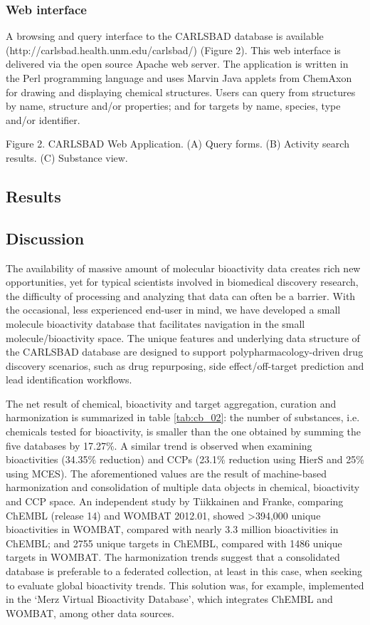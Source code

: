 \subsubsection{Web interface}

A browsing and query interface to the CARLSBAD database is available (http://carlsbad.health.unm.edu/carlsbad/) (Figure 2). This web interface is delivered via the open source Apache web server. The application is written in the Perl programming language and uses Marvin Java applets from ChemAxon for drawing and displaying chemical structures. Users can query from structures by name, structure and/or properties; and for targets by name, species, type and/or identifier.

Figure 2.
CARLSBAD Web Application. (A) Query forms. (B) Activity search results. (C) Substance view.

\subsection{Results}

\subsection{Discussion}

The availability of massive amount of molecular bioactivity data creates rich new opportunities, yet for typical scientists involved in biomedical discovery research, the difficulty of processing and analyzing that data can often be a barrier. With the occasional, less experienced end-user in mind, we have developed a small molecule bioactivity database that facilitates navigation in the small molecule/bioactivity space. The unique features and underlying data structure of the CARLSBAD database are designed to support polypharmacology-driven drug discovery scenarios, such as drug repurposing, side effect/off-target prediction and lead identification workflows.

The net result of chemical, bioactivity and target aggregation, curation and harmonization is summarized in table \ref{tab:cb_02}: the number of substances, i.e. chemicals tested for bioactivity, is smaller than the one obtained by summing the five databases by 17.27\%. A similar trend is observed when examining bioactivities (34.35\% reduction) and CCPs (23.1\% reduction using HierS and 25\% using MCES). The aforementioned values are the result of machine-based harmonization and consolidation of multiple data objects in chemical, bioactivity and CCP space. An independent study by Tiikkainen and Franke\cite{Tiikkainen2013-md,UniProt_Consortium2018-kq}, comparing ChEMBL (release 14) and WOMBAT 2012.01, showed \textgreater 394,000 unique bioactivities in WOMBAT, compared with nearly 3.3 million bioactivities in ChEMBL; and 2755 unique targets in ChEMBL, compared with 1486 unique targets in WOMBAT. The harmonization trends suggest that a consolidated database is preferable to a federated collection, at least in this case, when seeking to evaluate global bioactivity trends. This solution was, for example, implemented in the ‘Merz Virtual Bioactivity Database’, which integrates ChEMBL and WOMBAT, among other data sources.

